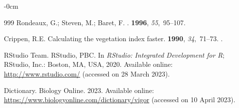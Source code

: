 \documentclass[jimaging,article,accept,pdftex,moreauthors]{Definitions/mdpi}
\begin{document}
\begin{adjustwidth}{-\extralength}{0cm}
\begin{thebibliography}{999}
Rondeaux, G.; Steven, M.; Baret, F.
.
 {\bf 1996}, {\em 55},~95--107.

Crippen, R.E.
\newblock Calculating the vegetation index faster.
 {\bf 1990}, {\em 34},~71--73.
.

{RStudio Team}.
\newblock RStudio, PBC. In {\em RStudio: Integrated Development for R}; RStudio, Inc.: Boston, MA, USA, %
 2020.
\newblock  Available online: \url{http://www.rstudio.com/}  (accessed on 28 March 2023). %

Dictionary.
\newblock Biology Online. 2023.
\newblock Available online: \url{https://www.biologyonline.com/dictionary/vigor} (accessed on 10 April 2023). %


\end{thebibliography}


\PublishersNote{}
\end{adjustwidth}
\end{document}
